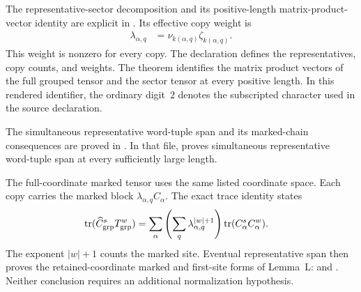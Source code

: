 \documentclass{article}
\begin{document}
The representative-sector decomposition and its positive-length
matrix-product-vector identity are explicit in
. Its effective copy weight
is
\begin{align}
    \lambda_{\alpha,q}
     & =\nu_{k(\alpha,q)}\zeta_{k(\alpha,q)}.
    \label{eq:cpgsv17_vertical_cf_grouping_representative_effective_weight}
\end{align}
This weight is nonzero for every copy. The declaration
defines the representatives, copy counts, and weights. The theorem
identifies the matrix product vectors of the full grouped tensor and the sector
tensor at every positive length. In this rendered identifier, the ordinary
digit~$2$ denotes the subscripted character used in the source declaration.

The simultaneous representative word-tuple span and its marked-chain
consequences are proved in
. In that file,
proves simultaneous representative word-tuple span at every sufficiently large
length.

The full-coordinate marked tensor uses the same listed coordinate space. Each
copy carries the marked block $\lambda_{\alpha,q}C_\alpha$. The exact trace
identity
states
\begin{align}
    \operatorname{tr}(\widehat C_{\mathrm{grp}}^sT_{\mathrm{grp}}^w)
     & =
    \sum_\alpha
    \left(\sum_q\lambda_{\alpha,q}^{|w|+1}\right)
    \operatorname{tr}(C_\alpha^sC_\alpha^w).
    \label{eq:cpgsv17_vertical_cf_grouping_representative_marked_trace}
\end{align}
The exponent $|w|+1$ counts the marked site. Eventual representative span then
proves the retained-coordinate marked and first-site forms of Lemma~L:
and
.
Neither conclusion requires an additional normalization hypothesis.
\end{document}
